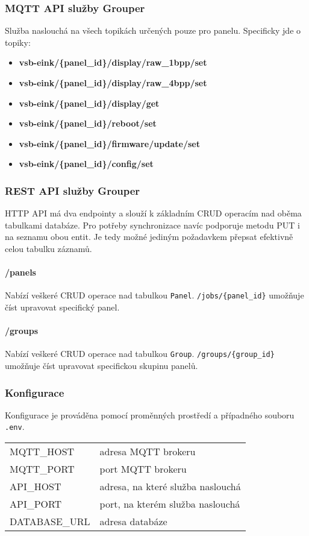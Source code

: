 \subsubsection{MQTT API služby Grouper}
Služba naslouchá na všech topikách určených pouze pro panelu. Specificky jde o topiky:
\begin{itemize}
    \item \textbf{vsb-eink/\{panel\_id\}/display/raw\_1bpp/set}
    \item \textbf{vsb-eink/\{panel\_id\}/display/raw\_4bpp/set}
    \item \textbf{vsb-eink/\{panel\_id\}/display/get}
    \item \textbf{vsb-eink/\{panel\_id\}/reboot/set}
    \item \textbf{vsb-eink/\{panel\_id\}/firmware/update/set}
    \item \textbf{vsb-eink/\{panel\_id\}/config/set}
\end{itemize}

\subsubsection{REST API služby Grouper}
HTTP API má dva endpointy a slouží k základním CRUD operacím nad oběma tabulkami databáze. Pro potřeby synchronizace navíc podporuje metodu PUT i na seznamu obou entit. Je tedy možné jediným požadavkem přepsat efektivně celou tabulku záznamů.

\paragraph*{/panels}
Nabízí veškeré CRUD operace nad tabulkou \lstinline|Panel|. \lstinline|/jobs/{panel_id}| umožňuje číst upravovat specifický panel.

\paragraph*{/groups}
Nabízí veškeré CRUD operace nad tabulkou \lstinline|Group|. \lstinline|/groups/{group_id}| umožňuje číst upravovat specifickou skupinu panelů.

\subsubsection{Konfigurace}
Konfigurace je prováděna pomocí proměnných prostředí a případného souboru \lstinline{.env}.
\begin{table}[h]
    \begin{tabular}{ll}
        MQTT\_HOST & adresa MQTT brokeru \\
        MQTT\_PORT & port MQTT brokeru \\
        API\_HOST & adresa, na které služba naslouchá \\
        API\_PORT & port, na kterém služba naslouchá \\
        DATABASE\_URL & adresa databáze \\
    \end{tabular}
\end{table}

